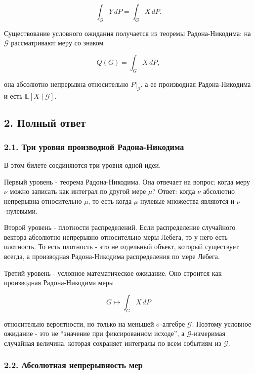 \documentclass[
  11pt,
  a4paper,
]{article}
\begin{document}
\[
\int_G Y\,dP=\int_G X\,dP.
\]

Существование условного ожидания получается из теоремы Радона-Никодима:
на \(\mathcal G\) рассматривают меру со знаком

\[
Q(G)=\int_G X\,dP,
\]

она абсолютно непрерывна относительно \(P|_{\mathcal G}\), а ее
производная Радона-Никодима и есть \(\mathbb E[X\mid\mathcal G]\).

\subsection{2. Полный
ответ}\label{ux43fux43eux43bux43dux44bux439-ux43eux442ux432ux435ux442}

\subsubsection{2.1. Три уровня производной
Радона-Никодима}\label{ux442ux440ux438-ux443ux440ux43eux432ux43dux44f-ux43fux440ux43eux438ux437ux432ux43eux434ux43dux43eux439-ux440ux430ux434ux43eux43dux430-ux43dux438ux43aux43eux434ux438ux43cux430}

В этом билете соединяются три уровня одной идеи.

Первый уровень - теорема Радона-Никодима. Она отвечает на вопрос: когда
меру \(\nu\) можно записать как интеграл по другой мере \(\mu\)? Ответ:
когда \(\nu\) абсолютно непрерывна относительно \(\mu\), то есть когда
\(\mu\)-нулевые множества являются и \(\nu\)-нулевыми.

Второй уровень - плотности распределений. Если распределение случайного
вектора абсолютно непрерывно относительно меры Лебега, то у него есть
плотность. То есть плотность - это не отдельный объект, который
существует всегда, а производная Радона-Никодима распределения по мере
Лебега.

Третий уровень - условное математическое ожидание. Оно строится как
производная Радона-Никодима меры

\[
G\mapsto\int_G X\,dP
\]

относительно вероятности, но только на меньшей \(\sigma\)-алгебре
\(\mathcal G\). Поэтому условное ожидание - это не ``значение при
фиксированном исходе'', а \(\mathcal G\)-измеримая случайная величина,
которая сохраняет интегралы по всем событиям из \(\mathcal G\).

\subsubsection{2.2. Абсолютная непрерывность
мер}\label{ux430ux431ux441ux43eux43bux44eux442ux43dux430ux44f-ux43dux435ux43fux440ux435ux440ux44bux432ux43dux43eux441ux442ux44c-ux43cux435ux440}
\end{document}
